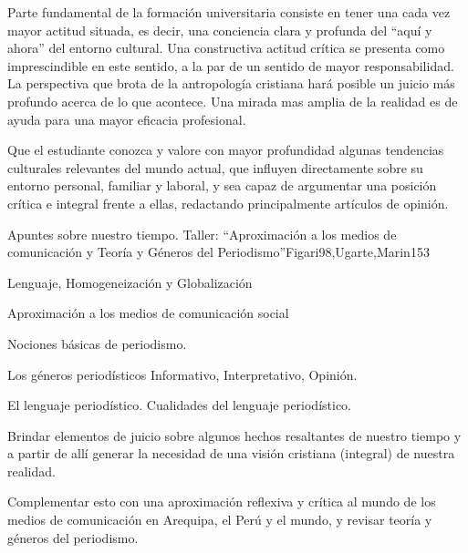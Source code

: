 \begin{syllabus}


\begin{justification}
Parte fundamental de la formación universitaria consiste en tener una cada vez mayor actitud situada, es decir, una conciencia clara y profunda del ``aquí y ahora'' del entorno cultural.  Una constructiva actitud crítica se presenta como imprescindible en este sentido, a la par de un sentido de mayor responsabilidad.  La perspectiva que brota de la antropología cristiana hará posible un juicio más profundo acerca de lo que acontece.  Una mirada mas amplia de la realidad es de ayuda para una mayor eficacia profesional.
\end{justification}

\begin{goals}
\item Que el estudiante conozca y valore con mayor profundidad algunas tendencias culturales relevantes del mundo actual, que influyen directamente sobre su entorno personal, familiar y laboral, y sea capaz de argumentar una posición crítica e integral frente a ellas, redactando principalmente artículos de opinión.
\end{goals}

\begin{outcomes}
\end{outcomes}

\begin{unit}{Apuntes sobre nuestro tiempo. Taller: ``Aproximación a los medios de comunicación y Teoría y Géneros del Periodismo''}{Figari98,Ugarte,Marin}{15}{3}
\begin{topics}
	\item Lenguaje, Homogeneización y Globalización
	\item Aproximación a los medios de comunicación social
	\item Nociones básicas de periodismo.
	\item Los géneros periodísticos Informativo, Interpretativo, Opinión.
	\item El lenguaje periodístico. Cualidades del lenguaje periodístico.
\end{topics}
\begin{learningoutcomes}
	\item Brindar elementos de juicio sobre algunos hechos resaltantes de nuestro tiempo y a partir de allí generar la necesidad de una visión cristiana (integral) de nuestra realidad. 	
	\item Complementar esto con una aproximación reflexiva y crítica al mundo de los medios de comunicación en Arequipa, el Perú y el mundo, y revisar teoría y géneros del periodismo.
\end{learningoutcomes}
\end{unit}


\end{syllabus}
